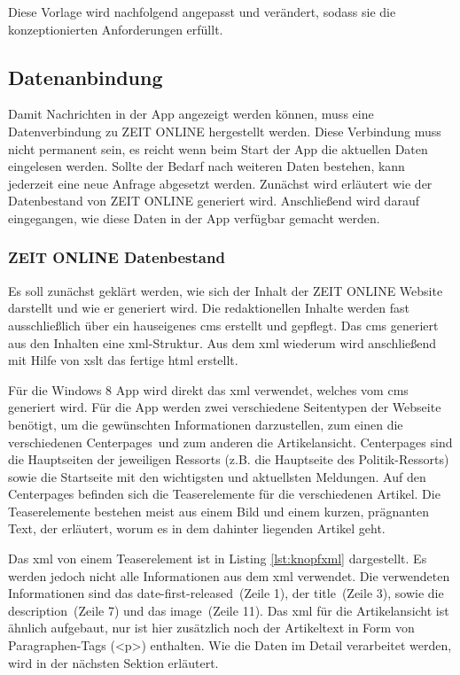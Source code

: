 \documentclass[12pt,a4paper,bibtotoc,abstracton]{scrartcl}
\begin{document}
Diese Vorlage wird nachfolgend angepasst und verändert, sodass sie die konzeptionierten Anforderungen erfüllt.

\subsection{Datenanbindung}
\label{subsec:datenanbindung}
Damit Nachrichten in der App angezeigt werden können, muss eine Datenverbindung zu ZEIT ONLINE hergestellt werden. Diese Verbindung muss nicht permanent sein, es reicht wenn beim Start der App die aktuellen Daten eingelesen werden. Sollte der Bedarf nach weiteren Daten bestehen, kann jederzeit eine neue Anfrage abgesetzt werden. Zunächst wird erläutert wie der Datenbestand von ZEIT ONLINE generiert wird. Anschließend wird darauf eingegangen, wie diese Daten in der App verfügbar gemacht werden.

\subsubsection{ZEIT ONLINE Datenbestand}
\label{subsubsec:zondatenbestand}
Es soll zunächst geklärt werden, wie sich der Inhalt der ZEIT ONLINE Website darstellt und wie er generiert wird. Die redaktionellen Inhalte werden fast ausschließlich über ein hauseigenes \ac{cms} erstellt und gepflegt. Das \ac{cms} generiert aus den Inhalten eine \ac{xml}-Struktur. Aus dem \ac{xml} wiederum wird anschließend mit Hilfe von \ac{xslt} das fertige \ac{html} erstellt.

Für die Windows 8 App wird direkt das \ac{xml} verwendet, welches vom \ac{cms} generiert wird. Für die App werden zwei verschiedene Seitentypen der Webseite benötigt, um die gewünschten Informationen darzustellen, zum einen die verschiedenen \glqq Centerpages\grqq\ und zum anderen die Artikelansicht. Centerpages sind die Hauptseiten der jeweiligen Ressorts (z.B. die Hauptseite des Politik-Ressorts) sowie die Startseite mit den wichtigsten und aktuellsten Meldungen. Auf den Centerpages befinden sich die Teaserelemente für die verschiedenen Artikel. Die Teaserelemente bestehen meist aus einem Bild und einem kurzen, prägnanten Text, der erläutert, worum es in dem dahinter liegenden Artikel geht.\\

\begin{minipage}{\linewidth}

\end{minipage}

Das \ac{xml} von einem Teaserelement ist in Listing \ref{lst:knopfxml} dargestellt. Es werden jedoch nicht alle Informationen aus dem \ac{xml} verwendet. Die verwendeten Informationen sind das \glqq date-first-released\grqq\ (Zeile 1), der \glqq title\grqq\ (Zeile 3), sowie die \glqq description\grqq\ (Zeile 7) und das \glqq image\grqq\ (Zeile 11). Das \ac{xml} für die Artikelansicht ist ähnlich aufgebaut, nur ist hier zusätzlich noch der Artikeltext in Form von Paragraphen-Tags (<p>) enthalten. Wie die Daten im Detail verarbeitet werden, wird in der nächsten Sektion erläutert.
\end{document}
